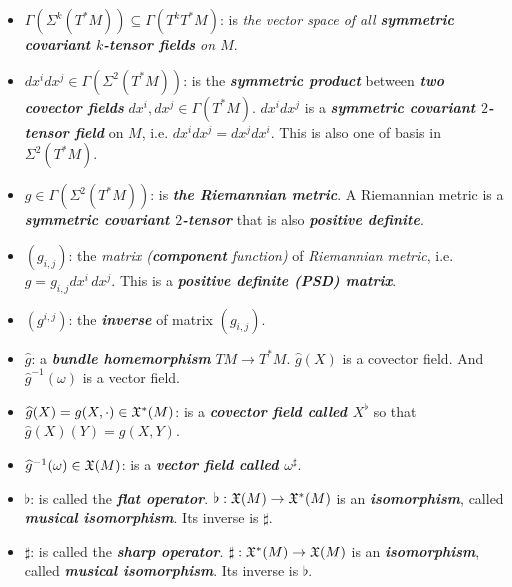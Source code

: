 \documentclass[11pt]{article}
\begin{document}
\begin{itemize}
\item $\Gamma(\Sigma^{k}(T^{*}M)) \subseteq \Gamma(T^kT^{*}M)$: \quad is \emph{the vector space of all \textbf{symmetric covariant $k$-tensor fields} on $M$}.

\item $dx^{i}dx^{j}  \in \Gamma(\Sigma^{2}(T^{*}M))$: \quad is the \emph{\textbf{symmetric product}}  between \emph{\textbf{two covector fields}} $dx^{i}, dx^{j} \in \Gamma(T^{*}M)$. $dx^{i}dx^{j}$ is a \emph{\textbf{symmetric covariant $2$-tensor field}} on $M$, i.e. $dx^i dx^j = dx^j dx^i$. This is also one of basis in $\Sigma^{2}(T^{*}M)$.

\item $g \in \Gamma(\Sigma^2(T^{*}M))$: \quad is \emph{\textbf{the Riemannian metric}}. A Riemannian metric is a \emph{\textbf{symmetric covariant $2$-tensor}} that is also \emph{\textbf{positive definite}}.

\item $(g_{i,j})$: \quad the \emph{matrix (\textbf{component} function)} of \emph{Riemannian metric}, i.e. $g = g_{i,j}dx^i\,dx^j$. This is a \emph{\textbf{positive definite (PSD) matrix}}.

\item $(g^{i,j})$: \quad the \emph{\textbf{inverse}} of matrix $(g_{i,j})$.

\item $\widehat{g}$: \quad a \emph{\textbf{bundle homemorphism}} $TM \rightarrow T^{*}M$. $\widehat{g}(X)$ is a covector field. And $\widehat{g}^{-1}(\omega)$ is a vector field. 

\item $\widehat{g}(X) = g(X, \cdot) \in {\mathfrak X}^{*}(M)$: \quad is a \emph{\textbf{covector field called $X^{\flat}$}} so that $\widehat{g}(X)(Y) = g(X, Y)$. 

\item $\widehat{g}^{-1}(\omega)  \in {\mathfrak X}(M)$: \quad is a \emph{\textbf{vector field called $\omega^{\sharp}$}}.

\item $\flat$: \quad  is called the \emph{\textbf{flat operator}}. $\flat: {\mathfrak X}(M) \rightarrow {\mathfrak X}^{*}(M)$  is an \emph{\textbf{isomorphism}}, called \emph{\textbf{musical isomorphism}}. Its inverse is $\sharp$.

\item $\sharp$: \quad is called the \emph{\textbf{sharp operator}}. $\sharp: {\mathfrak X}^{*}(M) \rightarrow {\mathfrak X}(M)$  is an \emph{\textbf{isomorphism}}, called \emph{\textbf{musical isomorphism}}. Its inverse is $\flat$.


\end{itemize}
\end{document}
